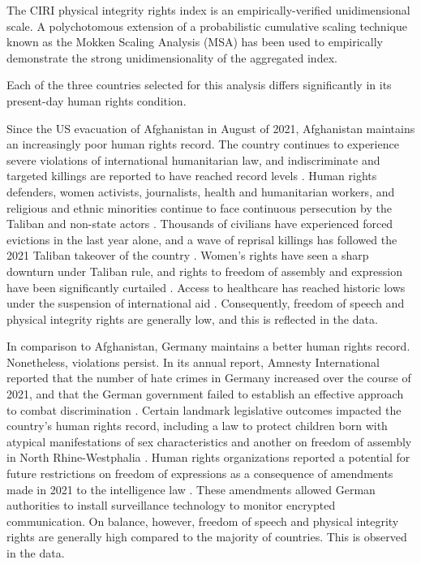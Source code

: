 \documentclass{article}
\begin{document}
The CIRI physical integrity rights index is an empirically-verified unidimensional scale. A polychotomous extension of a probabilistic cumulative scaling technique known as the Mokken Scaling Analysis (MSA) has been used to empirically demonstrate the strong unidimensionality of the aggregated index.

Each of the three countries selected for this analysis differs significantly in its present-day human rights condition.

Since the US evacuation of Afghanistan in August of 2021, Afghanistan maintains an increasingly poor human rights record. The country continues to experience severe violations of international humanitarian law, and indiscriminate and targeted killings are reported to have reached record levels \cite{AmnestyInternationalA}. Human rights defenders, women activists, journalists, health and humanitarian workers, and religious and ethnic minorities continue to face continuous persecution by the Taliban and non-state actors \cite{HumanRightsWatchA}. Thousands of civilians have experienced forced evictions in the last year alone, and a wave of reprisal killings has followed the 2021 Taliban takeover of the country \cite{AmnestyInternationalA}. Women's rights have seen a sharp downturn under Taliban rule, and rights to freedom of assembly and expression have been significantly curtailed \cite{UnitedNationsA}. Access to healthcare has reached historic lows under the suspension of international aid \cite{HumanRightsWatchA}. Consequently, freedom of speech and physical integrity rights are generally low, and this is reflected in the data.

In comparison to Afghanistan, Germany maintains a better human rights record. Nonetheless, violations persist. In its annual report, Amnesty International reported that the number of hate crimes in Germany increased over the course of 2021, and that the German government failed to establish an effective approach to combat discrimination \cite{AmnestyInternationalG}. Certain landmark legislative outcomes impacted the country's human rights record, including a law to protect children born with atypical manifestations of sex characteristics and another on freedom of assembly in North Rhine-Westphalia \cite{UnitedNationsG}. Human rights organizations reported a potential for future restrictions on freedom of expressions as a consequence of amendments made in 2021 to the intelligence law \cite{HumanRightsWatchG}. These amendments allowed German authorities to install surveillance technology to monitor encrypted communication. On balance, however, freedom of speech and physical integrity rights are generally high compared to the majority of countries. This is observed in the data.
\end{document}
